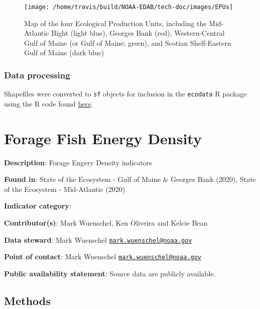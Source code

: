 \documentclass[
]{book}
\begin{document}
\begin{figure}

{\centering \texttt{[image: /home/travis/build/NOAA-EDAB/tech-doc/images/EPUs]} 

}

\caption{Map of the four Ecological Production Units, including the Mid-Atlantic Bight (light blue), Georges Bank (red), Western-Central Gulf of Maine (or Gulf of Maine; green), and Scotian Shelf-Eastern Gulf of Maine (dark blue)}\label{fig:EPUmap}
\end{figure}

\hypertarget{data-processing-9}{%
\subsection{Data processing}\label{data-processing-9}}

Shapefiles were converted to \texttt{sf} objects for inclusion in the \texttt{ecodata} R package using the R code found \href{https://raw.githubusercontent.com/NOAA-EDAB/ecodata/master/data-raw/get_epu_sf.R}{here}.

\hypertarget{forage-fish-energy-density}{%
\chapter{Forage Fish Energy Density}\label{forage-fish-energy-density}}

\textbf{Description}: Forage Engery Density indicators

\textbf{Found in}: State of the Ecosystem - Gulf of Maine \& Georges Bank (2020), State of the Ecosystem - Mid-Atlantic (2020)

\textbf{Indicator category}:

\textbf{Contributor(s)}: Mark Wuenschel, Ken Oliveira and Kelcie Bean

\textbf{Data steward}: Mark Wuenschel \href{mailto:mark.wuenschel@noaa.gov}{\nolinkurl{mark.wuenschel@noaa.gov}}

\textbf{Point of contact}: Mark Wuenschel \href{mailto:mark.wuenschel@noaa.gov}{\nolinkurl{mark.wuenschel@noaa.gov}}

\textbf{Public availability statement}: Source data are publicly available.

\hypertarget{methods-14}{%
\section{Methods}\label{methods-14}}
\end{document}
